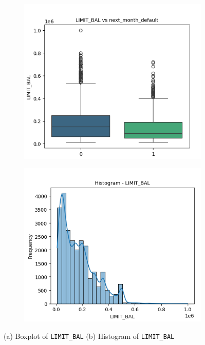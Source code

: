 \documentclass[12pt,a4paper]{article}
\begin{document}
\begin{figure}[H]
    \centering
    \begin{subfigure}[b]{0.48\textwidth}
        \centering
        \includegraphics[width=\textwidth]{figures/1a.png}
        \caption{}
    \end{subfigure}
    \hfill
    \begin{subfigure}[b]{0.48\textwidth}
        \centering
        \includegraphics[width=\textwidth]{figures/1b.png}
        \caption{}
    \end{subfigure}
    \caption{(a) Boxplot of \texttt{LIMIT\_BAL} \quad (b) Histogram of \texttt{LIMIT\_BAL}}
\end{figure}
\end{document}
